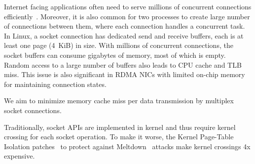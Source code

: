Internet facing applications often need to serve millions of concurrent connections efficiently~\cite{nishtala2013scaling,lin2016scalable,belay2017ix}.
Moreover, it is also common for two processes to create large number of connections between them, where each connection handles a concurrent task.
In Linux, a socket connection has dedicated send and receive buffers, each is at least one page (4~KiB) in size. With millions of concurrent connections, the socket buffers can consume gigabytes of memory, most of which is empty.
Random access to a large number of buffers also leads to CPU cache and TLB miss.
This issue is also significant in RDMA NICs with limited on-chip memory for maintaining connection states.

We aim to minimize memory cache miss per data transmission by multiplex socket connections.


Traditionally, socket APIs are implemented in kernel and thus require kernel crossing for each socket operation.
To make it worse, the Kernel Page-Table Isolation patches~\cite{kpti} to protect against Meltdown~\cite{Lipp2018meltdown} attacks make kernel crossings 4x expensive.

